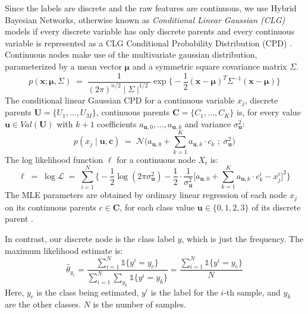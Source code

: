 \documentclass{article}
\begin{document}
Since the labels are discrete and the raw features are continuous, we use
Hybrid Bayesian Networks, otherwise known as
\textit{Conditional Linear Gaussian (CLG)} models if
every discrete variable has only discrete parents and every continuous variable
is represented as a CLG Conditional Probability Distribution (CPD) \cite{koller}.
Continuous nodes make use of the multivariate gaussian distribution, parameterized
by a mean vector $\mathbf{\mu}$ and a symmetric square covariance matrix $\Sigma$.
\begin{equation}
  p(\mathbf{x}; \mathbf{\mu}, \Sigma) \; = \; \frac{1}{(2 \pi)^{n/2} \mid \Sigma \mid^{1/2}} \exp \Big\{ -\frac{1}{2} (\mathbf{x} - \mathbf{\mu})^T \Sigma^{-1} (\mathbf{x} - \mathbf{\mu})  \Big\}
\end{equation}
The conditional linear Gaussian CPD for a continuous variable $x_j$, discrete
parents $\mathbf{U} = \{U_1, \hdots, U_M\}$, continuous parents
$\mathbf{C} = \{C_1, \hdots, C_K\}$ is, for every value
$\mathbf{u} \in Val(\mathbf{U})$ with $k+1$ coefficients
$a_{\mathbf{u},0}, \hdots, a_{\mathbf{u}, k}$ and variance
$\sigma^2_{\mathbf{u}}$:
\begin{equation}
  p(x_j \mid \mathbf{u}, \mathbf{c}) \; = \; \mathcal{N} \Bigg(a_{\mathbf{u},0} + \sum_{k=1}^K a_{\mathbf{u},k} \cdot c_k \; ; \; \sigma^2_{\mathbf{u}}  \Bigg)
\end{equation}
The log likelihood function $\ell$ for a continuous node $X_i$ is:
\begin{equation}
  \ell \; = \; \log \mathcal{L} \; = \; \sum_{i=1}^{N} \Bigg\{ -\frac{1}{2} \log (2\pi \sigma^2_{\mathbf{u}}) - \frac{1}{2} \cdot \frac{1}{\sigma^2_{\mathbf{u}}} \Bigg[ a_{\mathbf{u},0} + \sum_{k=1}^K a_{\mathbf{u},k} \cdot c_k^i - x_j^i \Bigg]^2 \Bigg\}
\end{equation}
The MLE parameters are obtained by ordinary linear regression of each node $x_j$
on its continuous parents $c \in \mathbf{C}$, for each class value
$\mathbf{u} \in \{0, 1, 2, 3\}$ of its discrete parent \cite{koller}.

In contrast, our discrete node is the class label $y$, which is just the frequency.
The maximum likelihood estimate is:
\begin{equation}
  \hat{\theta}_{y_c} = \frac{ \sum_{i=1}^{N} \mathds{1} \{ y^{i} = y_c \} }{ \sum_{i=1}^{N} \sum_{y_k} \mathds{1} \{y^i = y_k\} } = \frac{\sum_{i=1}^{N} \mathds{1} \{ y^{i} = y_c \}}{N}
\end{equation}
Here, $y_c$ is the class being estimated, $y^i$ is the label for the $i$-th sample,
and $y_k$ are the other classes. $N$ is the number of samples.
\end{document}
